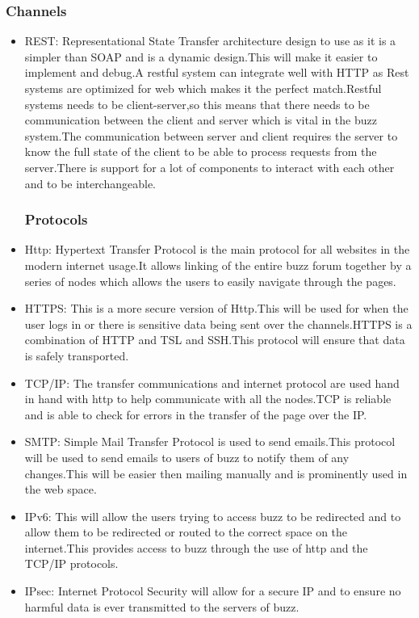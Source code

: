 
\subsubsection{Channels}
\begin{itemize}
\item REST: Representational State Transfer architecture design to use as it is a simpler than SOAP and is a dynamic design.This will make it easier to implement and debug.A restful system can integrate well with HTTP as Rest systems are optimized for web which makes it the perfect match.Restful systems needs to be client-server,so this means that there needs to be communication between the client and server which is vital in the buzz system.The communication between server and client requires the server to know the full state of the client to be able to process requests from the server.There is support for a lot of components to interact with each other and to be interchangeable.
\subsubsection{Protocols}
\item Http: Hypertext Transfer Protocol is the main protocol for all websites in the modern internet usage.It allows linking of the entire buzz forum together by a series of nodes which allows the users to easily navigate through the pages.
\item HTTPS: This is a more secure version of Http.This will be used for when the user logs in or there is sensitive data being sent over the channels.HTTPS is a combination of HTTP and TSL and SSH.This protocol will ensure that data is safely transported.
\item TCP/IP: The transfer communications and internet protocol are used hand in hand with http to help communicate with all the nodes.TCP is reliable and is able to check for errors in the transfer of the page over the IP.
\item SMTP: Simple Mail Transfer Protocol is used to send emails.This protocol will be used to send emails to users of buzz to notify them of any changes.This will be easier then mailing manually and is prominently used in the web space.
\item IPv6: This will allow the users trying to  access buzz to be redirected and to allow them to be redirected or routed to the correct space on the internet.This provides access to buzz through the use of http and the TCP/IP protocols.
\item IPsec: Internet Protocol Security will allow for a secure IP and to ensure no harmful data is ever transmitted to the servers of buzz.
\end{itemize}

